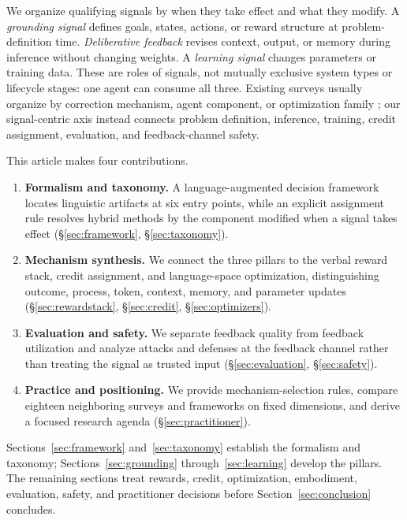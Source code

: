 We organize qualifying signals by when they take effect and what they modify. A \emph{grounding signal} defines goals, states, actions, or reward structure at problem-definition time. \emph{Deliberative feedback} revises context, output, or memory during inference without changing weights. A \emph{learning signal} changes parameters or training data. These are roles of signals, not mutually exclusive system types or lifecycle stages: one agent can consume all three. Existing surveys usually organize by correction mechanism, agent component, or optimization family \citep{pan2023automatically,zhang2025survey,wang2024reinforcement}; our signal-centric axis instead connects problem definition, inference, training, credit assignment, evaluation, and feedback-channel safety.

This article makes four contributions.
\begin{enumerate}
    \item \textbf{Formalism and taxonomy.} A language-augmented decision framework locates linguistic artifacts at six entry points, while an explicit assignment rule resolves hybrid methods by the component modified when a signal takes effect (\S\ref{sec:framework}, \S\ref{sec:taxonomy}).
    \item \textbf{Mechanism synthesis.} We connect the three pillars to the verbal reward stack, credit assignment, and language-space optimization, distinguishing outcome, process, token, context, memory, and parameter updates (\S\ref{sec:rewardstack}, \S\ref{sec:credit}, \S\ref{sec:optimizers}).
    \item \textbf{Evaluation and safety.} We separate feedback quality from feedback utilization and analyze attacks and defenses at the feedback channel rather than treating the signal as trusted input (\S\ref{sec:evaluation}, \S\ref{sec:safety}).
    \item \textbf{Practice and positioning.} We provide mechanism-selection rules, compare eighteen neighboring surveys and frameworks on fixed dimensions, and derive a focused research agenda (\S\ref{sec:practitioner}).
\end{enumerate}

Sections~\ref{sec:framework} and~\ref{sec:taxonomy} establish the formalism and taxonomy; Sections~\ref{sec:grounding} through~\ref{sec:learning} develop the pillars. The remaining sections treat rewards, credit, optimization, embodiment, evaluation, safety, and practitioner decisions before Section~\ref{sec:conclusion} concludes.

